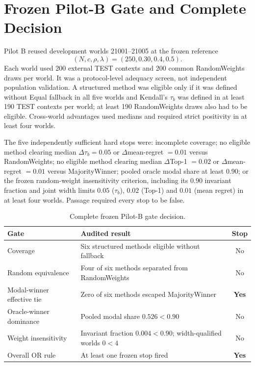 \documentclass[runningheads,orivec]{llncs}
\begin{document}
\section{Frozen Pilot-B Gate and Complete Decision}

Pilot B reused development worlds 21001--21005 at the frozen reference
\begin{equation}
(N,c,\rho,\lambda)=(250,0.30,0.4,0.5).
\label{supp:eq:pilotbreference}
\end{equation}
Each world used 200 external TEST contexts and 200 common
RandomWeights draws per world. It was a protocol-level adequacy screen, not independent
population validation. A structured method was eligible only if it was defined without Equal
fallback in all five worlds and Kendall's $\tau_b$ was defined in at least 190 TEST contexts per
world; at least 190 RandomWeights draws also had to be eligible. Cross-world advantages used
medians and required strict positivity in at least four worlds.

The five independently sufficient hard stops were: incomplete coverage; no eligible method
clearing median $\Delta\tau_b=0.05$ or $\Delta$mean-regret $=0.01$ versus RandomWeights; no
eligible method clearing median $\Delta$Top-1 $=0.02$ or $\Delta$mean-regret $=0.01$ versus
MajorityWinner; pooled oracle modal share at least $0.90$; or the frozen random-weight
insensitivity criterion, including its $0.90$ invariant fraction and joint width limits
$0.05$ ($\tau_b$), $0.02$ (Top-1) and $0.01$ (mean regret) in at least four worlds. Passage
required every stop to be false.

\begin{table}[t]
\centering
\caption{Complete frozen Pilot-B gate decision.}
\label{supp:tab:pilotbgates}
\small
\begin{tabularx}{\linewidth}{@{}lXc@{}}
\toprule
Gate & Audited result & Stop\\
\midrule
Coverage & Six structured methods eligible without fallback & No\\
Random equivalence & Four of six methods separated from RandomWeights & No\\
Modal-winner effective tie & Zero of six methods escaped MajorityWinner & \textbf{Yes}\\
Oracle-winner dominance & Pooled modal share $0.526<0.90$ & No\\
Weight insensitivity & Invariant fraction $0.004<0.90$; width-qualified worlds $0<4$ & No\\
\midrule
Overall OR rule & At least one frozen stop fired & \textbf{Yes}\\
\bottomrule
\end{tabularx}
\end{table}
\end{document}
